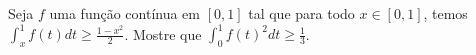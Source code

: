 Seja \(f\) uma função contínua em \([0,1]\) tal que para todo \(x\in [0,1]\),
temos \(\int_{x}^{1}f(t)dt \geq\frac{1-x^{2}}{2}\). Mostre que \(\int_{0}^{1}f(t)^{2}dt \geq \frac{1}{3}\).
